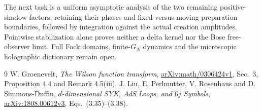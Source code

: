 \documentclass[11pt,a4paper]{article}
\begin{document}
The next task is a uniform asymptotic analysis of the two remaining
positive-shadow factors, retaining their phases and fixed-versus-moving
preparation boundaries, followed by integration against the actual
creation amplitudes. Pointwise stabilization alone proves neither a
delta kernel nor the Bose free-observer limit. Full Fock domains,
finite-$G_N$ dynamics and the microscopic holographic dictionary remain open.

\begin{thebibliography}{9}
 W. Groenevelt, \emph{The Wilson function transform},
\href{https://arxiv.org/html/math/0306424v1}{arXiv:math/0306424v1},
Sec.\ 3, Proposition 4.4 and Remark 4.5(iii).
 J. Liu, E. Perlmutter, V. Rosenhaus and D. Simmons-Duffin,
\emph{$d$-dimensional SYK, AdS Loops, and $6j$ Symbols},
\href{https://arxiv.org/html/1808.00612v3}{arXiv:1808.00612v3},
Eqs.\ (3.35)--(3.38).
\end{thebibliography}
\end{document}
